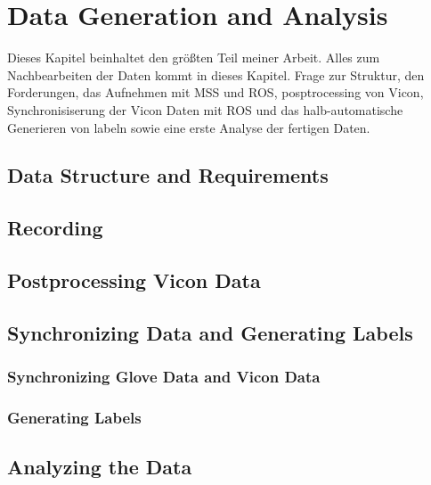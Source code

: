 
\chapter{Data Generation and Analysis} %

\label{Data} %

\begin{text}
Dieses Kapitel beinhaltet den größten Teil meiner Arbeit. Alles zum Nachbearbeiten der Daten kommt in dieses Kapitel. Frage zur Struktur, den Forderungen, das Aufnehmen mit MSS und ROS, posptrocessing von Vicon, Synchronisiserung der Vicon Daten mit ROS und das halb-automatische Generieren von labeln sowie eine erste Analyse der fertigen Daten.
\end{text}

\section{Data Structure and Requirements}

\section{Recording}

\section{Postprocessing Vicon Data}

\section{Synchronizing Data and Generating Labels}
\subsection{Synchronizing Glove Data and Vicon Data}
\subsection{Generating Labels}

\section{Analyzing the Data}